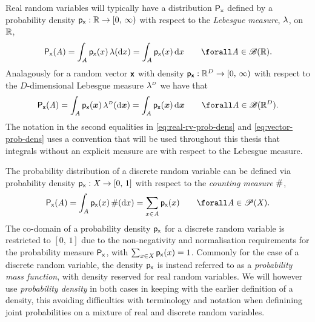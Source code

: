 Real random variables will typically have a distribution $\mathsf{P}_{\mathsf{x}}$ defined by a probability density $\mathsf{p}_{\mathsf{x}} : \mathbb{R} \to [0,\,\infty)$ with respect to the \emph{Lebesgue measure}, $\lebm{1}$, on $\mathbb{R}$,
\begin{equation}\label{eq:real-rv-prob-dens}
    \prob{\rvar{x}}(\set{A})
    = \int_{\set{A}} \pden{\rvar{x}}(x) \,\lebm{1}(\dr x)
    = \int_{\set{A}} \pden{\rvar{x}}(x) \,\dr x
    \qquad
    \forall \set{A} \in \borel(\reals).
\end{equation}
Analagously for a random vector $\boldsymbol{\mathsf{x}}$ with density $\mathsf{p}_{\boldsymbol{\mathsf{x}}} : \mathbb{R}^D \to [0,\,\infty)$ with respect to the $D$-dimensional Lebesgue measure $\lebm{D}$ we have that
\begin{equation}\label{eq:vector-prob-dens}
    \prob{\rvct{x}}(\set{A})
    = \int_{\set{A}} \pden{\rvct{x}}(\vct{x}) \,\lebm{D}(\dr \vct{x})
    = \int_{\set{A}} \pden{\rvct{x}}(\vct{x}) \,\dr \vct{x}
    \qquad
    \forall \set{A} \in \borel(\reals^D).
\end{equation}
The notation in the second equalities in \eqref{eq:real-rv-prob-dens} and \eqref{eq:vector-prob-dens} uses a convention that will be used throughout this thesis that integrals without an explicit measure are with respect to the Lebesgue measure. 

The probability distribution of a discrete random variable can be defined via probability density $\mathsf{p}_{\mathsf{x}} : \mathit{X} \to [0,\,1]$ with respect to the \emph{counting measure} $\#$,
\begin{equation}
    \prob{\rvar{x}}(\set{A})
    = \int_{\set{A}} \pden{\rvar{x}}(x) \,\countm(\dr x)
    = \sum_{x \in \set{A}} \pden{\rvar{x}}(x) 
    \qquad
    \forall \set{A} \in \powerset(\set{X}).
\end{equation}
The co-domain of a probability density $\mathsf{p}_{\mathsf{x}}$ for a discrete random variable is restricted to $[0,\,1]$ due to the non-negativity and normalisation requirements for the probability measure $\mathsf{P}_{\mathsf{x}}$, with $\sum_{x\in\mathit{X}} \mathsf{p}_{\mathsf{x}}(x) = 1$. Commonly for the case of a discrete random variable, the density $\mathsf{p}_{\mathsf{x}}$ is instead referred to as a \emph{probability mass function}, with density reserved for real random variables. We will however use \emph{probability density} in both cases in keeping with the earlier definition of a density, this avoiding difficulties with terminology and notation when definining joint probabilities on a mixture of real and discrete random variables.

